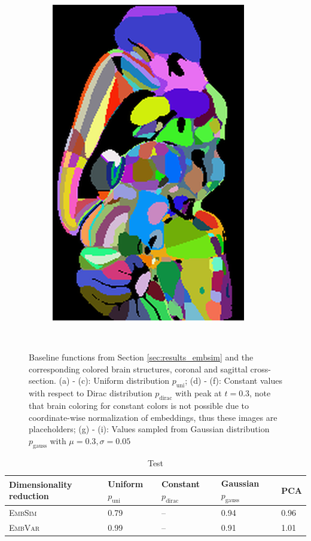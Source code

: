 \documentclass[]{article}
\begin{document}
\begin{figure}
\begin{subfigure}{0.3\textwidth}
		\includegraphics[width=.67\linewidth, angle=270]{../results/random_noise__ano_sagittal_50_res_slice_1.png}
		\caption{}
	\end{subfigure}\\
	\caption{Baseline functions from Section \ref{sec:results_embsim} and the corresponding colored brain structures, coronal and sagittal cross-section. (a) - (c): Uniform distribution $p_\text{uni}$; (d) - (f): Constant values with respect to Dirac distribution $p_\text{dirac}$ with peak at $t=0.3$, note that brain coloring for constant colors is not possible due to coordinate-wise normalization of embeddings, thus these images are placeholders; (g) - (i): Values sampled from Gaussian distribution $p_\text{gauss}$ with $\mu=0.3, \sigma=0.05$}
	\label{fig:baseline_distributions}
\end{figure}

\begin{table}
	\centering
	\renewcommand{\arraystretch}{1.5}
	\begin{tabular}{|l|llll|}
		\hline
		Dimensionality reduction&Uniform $p_\text{uni}$ &Constant $p_\text{dirac}$&Gaussian $p_\text{gauss}$&PCA\\
		\hline
		\textsc{EmbSim}&0.79& -- & 0.94&0.96\\
		\textsc{EmbVar}&0.99& -- & 0.91 & 1.01\\ 
		\hline
		
	\end{tabular}

	\caption{Test}
	\label{tab:dim_red_results}
\end{table}
\end{document}
